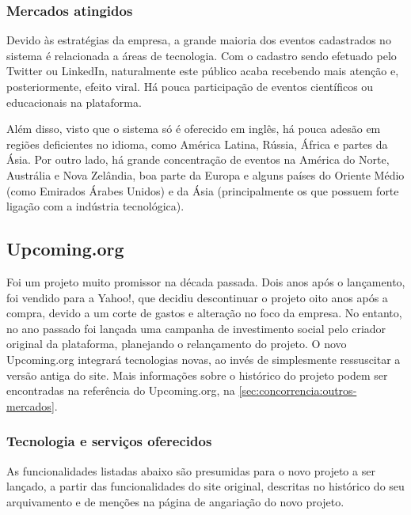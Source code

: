 \documentclass[12pt,a4paper,twoside,hyphens,english,brazil]{abntex2}
\begin{document}
\subsubsection*{Mercados atingidos}
Devido às estratégias da empresa, a grande maioria dos eventos cadastrados no sistema é relacionada a áreas de tecnologia. Com o cadastro sendo efetuado pelo Twitter ou LinkedIn, naturalmente este público acaba recebendo mais atenção e, posteriormente, efeito viral. Há pouca participação de eventos científicos ou educacionais na plataforma.

Além disso, visto que o sistema só é oferecido em inglês, há pouca adesão em regiões deficientes no idioma, como América Latina, Rússia, África e partes da Ásia. Por outro lado, há grande concentração de eventos na América do Norte, Austrália e Nova Zelândia, boa parte da Europa e alguns países do Oriente Médio (como Emirados Árabes Unidos) e da Ásia (principalmente os que possuem forte ligação com a indústria tecnológica).

\subsection{Upcoming.org}  \label{sec:concorrencia:upcoming:tec}
Foi um projeto muito promissor na década passada. Dois anos após o lançamento, foi vendido para a Yahoo!, que decidiu descontinuar o projeto oito anos após a compra, devido a um corte de gastos e alteração no foco da empresa. No entanto, no ano passado foi lançada uma campanha de investimento social pelo criador original da plataforma, planejando o relançamento do projeto. O novo Upcoming.org integrará tecnologias novas, ao invés de simplesmente ressuscitar a versão antiga do site\cite{upcoming-90-min}. Mais informações sobre o histórico do projeto podem ser encontradas na referência do Upcoming.org, na \autoref{sec:concorrencia:outros-mercados}.

\subsubsection*{Tecnologia e serviços oferecidos}
As funcionalidades listadas abaixo são presumidas para o novo projeto a ser lançado, a partir das funcionalidades do site original, descritas no histórico do seu arquivamento\cite{upcoming-archive} e de menções na página de angariação do novo projeto\cite{upcoming-kickstarter}.
\end{document}
